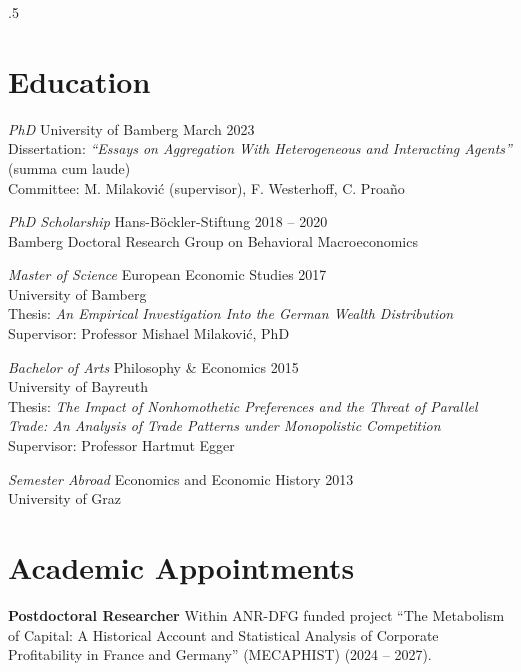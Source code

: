 \documentclass[margin]{res}
\begin{document}
\vspace{.3cm}
\moveleft.5\hoffset{}
\begin{resume}
	\setlength{\parskip}{0.52\baselineskip}
	
	
	
	\section{Education}
	{\sl PhD} University of Bamberg \hfill March 2023 \\
	Dissertation: \textit{``Essays on Aggregation With Heterogeneous and Interacting Agents''} (summa cum laude)\\
	Committee: M. Milakovi\'c (supervisor), F. Westerhoff, C. Proa\~no
	
	
	{\sl PhD Scholarship} Hans-B\"ockler-Stiftung \hfill 2018 -- 2020\\
	Bamberg Doctoral Research Group on Behavioral Macroeconomics 
	
	{\sl Master of Science} European Economic Studies \hfill 2017\\
	University of Bamberg\\ 
	Thesis: \textit{An Empirical Investigation Into the German Wealth Distribution}\\
	Supervisor: Professor Mishael Milakovi\'c, PhD 
	
	{\sl Bachelor of Arts} Philosophy \& Economics \hfill 2015\\ 
	University of Bayreuth\\
	Thesis: \textit{The Impact of Nonhomothetic Preferences and the Threat of Parallel Trade: An Analysis of Trade Patterns under Monopolistic Competition}\\ %
	Supervisor:  Professor Hartmut Egger
	
	{\sl Semester Abroad} Economics and Economic History \hfill 2013\\
	University of Graz\\ 
	
	\section{Academic Appointments}
	\textbf{Postdoctoral Researcher}
	Within ANR-DFG funded project ``The Metabolism of Capital: A Historical Account and Statistical Analysis of Corporate Profitability in France and Germany'' (MECAPHIST) (2024 -- 2027).
	

\end{resume}
\end{document}
